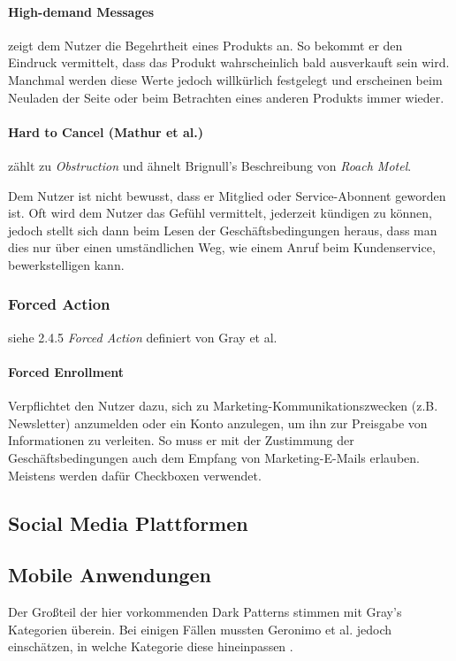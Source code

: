 \documentclass[a4paper]{article}
\newcommand{\todo}[1]{{\color{purple}{#1}}}
\begin{document}
\paragraph{High-demand Messages} zeigt dem Nutzer die Begehrtheit eines Produkts an. So bekommt er den Eindruck vermittelt, dass das Produkt wahrscheinlich bald ausverkauft sein wird. Manchmal werden diese Werte jedoch willkürlich festgelegt und erscheinen beim Neuladen der Seite oder beim Betrachten eines anderen Produkts immer wieder.

\paragraph{Hard to Cancel (Mathur et al.)} zählt zu \textit{Obstruction} und ähnelt Brignull's Beschreibung von \textit{Roach Motel}. 

Dem Nutzer ist nicht bewusst, dass er Mitglied oder Service-Abonnent geworden ist. Oft wird dem Nutzer das Gefühl vermittelt, jederzeit kündigen zu können, jedoch stellt sich dann beim Lesen der Geschäftsbedingungen heraus, dass man dies nur über einen umständlichen Weg, wie einem Anruf beim Kundenservice, bewerkstelligen kann. 

\subsubsection{Forced Action}
siehe 2.4.5 \textit{Forced Action} definiert von Gray et al.

\paragraph{Forced Enrollment}
Verpflichtet den Nutzer dazu, sich zu Marketing-Kommunikationszwecken (z.B. Newsletter) anzumelden oder ein Konto anzulegen, um ihn zur Preisgabe von Informationen zu verleiten. So muss er mit der Zustimmung der Geschäftsbedingungen auch dem Empfang von Marketing-E-Mails erlauben. Meistens werden dafür Checkboxen verwendet.

\subsection{Social Media Plattformen}
\label{sub:soziale_netzwerke}
\todo{Text hinzufügen}

\subsection{Mobile Anwendungen}
\label{sub:mobile_anwendungen}
Der Großteil der hier vorkommenden Dark Patterns stimmen mit Gray's Kategorien überein. Bei einigen Fällen mussten Geronimo et al. jedoch einschätzen, in welche Kategorie diese hineinpassen \cite{geronimo}.
\end{document}
